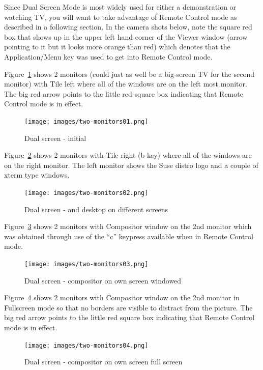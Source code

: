 Since Dual Screen Mode is most widely used for either a demonstration or watching TV, you will want to take advantage of Remote Control mode as described in a following section.  In the camera shots below, note the square red box that shows up in the upper left hand corner of the Viewer window (arrow pointing to it but it looks more orange than red) which denotes that the Application/Menu key was used to get into Remote Control mode.

Figure~\ref{fig:two-monitors01} shows 2 monitors (could just as well be a big-screen TV for the second monitor) with Tile left where all of the \CGG{} windows are on the left most monitor.  The big red arrow points to the little red square box indicating that Remote Control mode is in effect.

\begin{figure}[htpb]
    \centering
    \texttt{[image: images/two-monitors01.png]}
    \caption{Dual screen - initial}
    \label{fig:two-monitors01}
\end{figure}

Figure~\ref{fig:two-monitors02} shows 2 monitors with Tile right (b key) where all of the \CGG{} windows are on the right monitor.  The left monitor shows the Suse distro logo and a couple of xterm type windows.

\begin{figure}[htpb]
    \centering
    \texttt{[image: images/two-monitors02.png]}
    \caption{Dual screen - \CGG{} and desktop on different screens}
    \label{fig:two-monitors02}
\end{figure}

Figure~\ref{fig:two-monitors03} shows 2 monitors with Compositor window on the 2nd monitor which was obtained through use of the “c” keypress available when in Remote Control mode.

\begin{figure}[htpb]
    \centering
    \texttt{[image: images/two-monitors03.png]}
    \caption{Dual screen - \CGG{} compositor on own screen windowed}
    \label{fig:two-monitors03}
\end{figure}

Figure~\ref{fig:two-monitors04} shows 2 monitors with Compositor window on the 2nd monitor in Fullscreen mode so that no \CGG{} borders are visible to distract from the picture.  The big red arrow points to the little red square box indicating that Remote Control mode is in effect.

\begin{figure}[htpb]
    \centering
    \texttt{[image: images/two-monitors04.png]}
    \caption{Dual screen - \CGG{} compositor on own screen full screen}
    \label{fig:two-monitors04}
\end{figure}

